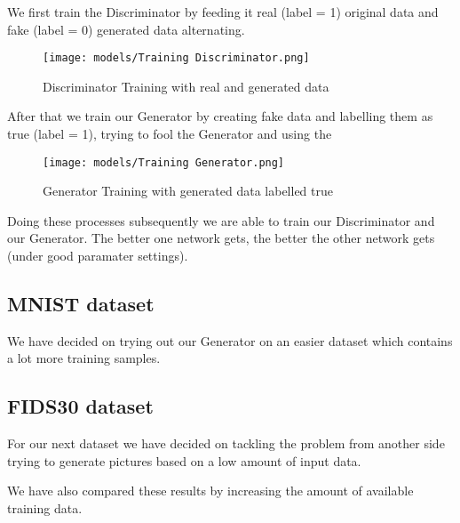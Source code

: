 \documentclass{article}
\begin{document}

We first train the Discriminator by feeding it real (label = 1) original data and fake (label = 0) generated data alternating.

\begin{figure}[h!]
\centering
\centerline{\texttt{[image: models/Training Discriminator.png]}}
\caption{Discriminator Training with real and generated data}
\label{fig:train_discriminator}
\end{figure}

After that we train our Generator by creating fake data and labelling them as true (label = 1), trying to fool the Generator and using the
\begin{figure}[h!]
\centering
\centerline{\texttt{[image: models/Training Generator.png]}}
\caption{Generator Training with generated data labelled true }
\label{fig:train_generator}
\end{figure}

Doing these processes subsequently we are able to train our Discriminator and our Generator. The better one network gets, the better the other network gets (under good paramater settings).





\subsection{MNIST dataset}
We have decided on trying out our Generator on an easier dataset which contains a lot more training samples.



\subsection{FIDS30 dataset}
For our next dataset we have decided on tackling the problem from another side trying to generate pictures based on a low amount of input data.

We have also compared these results by increasing the amount of available training data.



\end{document}
